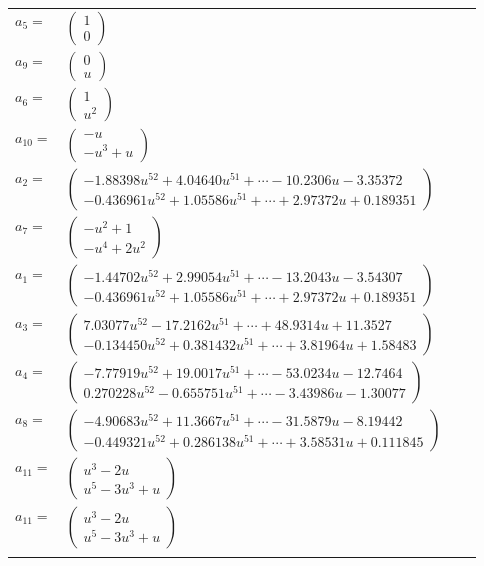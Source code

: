 \documentclass[1p]{elsarticle_modified}
\theoremstyle{definition}
\begin{document}
\begin{tabular}{m{7pt} m{180pt} m{7pt} m{180pt} }
\flushright $a_{5}=$&$\begin{pmatrix}1\\0\end{pmatrix}$ \\
\flushright $a_{9}=$&$\begin{pmatrix}0\\u\end{pmatrix}$ \\
\flushright $a_{6}=$&$\begin{pmatrix}1\\u^2\end{pmatrix}$ \\
\flushright $a_{10}=$&$\begin{pmatrix}- u\\- u^3+u\end{pmatrix}$ \\
\flushright $a_{2}=$&$\begin{pmatrix}-1.88398 u^{52}+4.04640 u^{51}+\cdots-10.2306 u-3.35372\\-0.436961 u^{52}+1.05586 u^{51}+\cdots+2.97372 u+0.189351\end{pmatrix}$ \\
\flushright $a_{7}=$&$\begin{pmatrix}- u^2+1\\- u^4+2 u^2\end{pmatrix}$ \\
\flushright $a_{1}=$&$\begin{pmatrix}-1.44702 u^{52}+2.99054 u^{51}+\cdots-13.2043 u-3.54307\\-0.436961 u^{52}+1.05586 u^{51}+\cdots+2.97372 u+0.189351\end{pmatrix}$ \\
\flushright $a_{3}=$&$\begin{pmatrix}7.03077 u^{52}-17.2162 u^{51}+\cdots+48.9314 u+11.3527\\-0.134450 u^{52}+0.381432 u^{51}+\cdots+3.81964 u+1.58483\end{pmatrix}$ \\
\flushright $a_{4}=$&$\begin{pmatrix}-7.77919 u^{52}+19.0017 u^{51}+\cdots-53.0234 u-12.7464\\0.270228 u^{52}-0.655751 u^{51}+\cdots-3.43986 u-1.30077\end{pmatrix}$ \\
\flushright $a_{8}=$&$\begin{pmatrix}-4.90683 u^{52}+11.3667 u^{51}+\cdots-31.5879 u-8.19442\\-0.449321 u^{52}+0.286138 u^{51}+\cdots+3.58531 u+0.111845\end{pmatrix}$ \\
\flushright $a_{11}=$&$\begin{pmatrix}u^3-2 u\\u^5-3 u^3+u\end{pmatrix}$\\ \flushright $a_{11}=$&$\begin{pmatrix}u^3-2 u\\u^5-3 u^3+u\end{pmatrix}$\\&\end{tabular}
\end{document}
